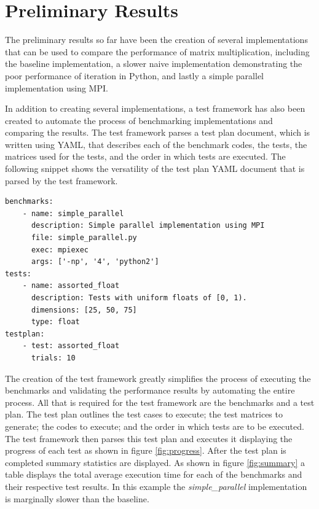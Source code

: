 \documentclass[oneside]{article}
\begin{document}
\section{Preliminary Results}

The preliminary results so far have been the creation of several implementations that can be used to compare the performance of matrix multiplication, including the baseline implementation, a slower naive implementation demonstrating the poor performance of iteration in Python, and lastly a simple parallel implementation using MPI.

In addition to creating several implementations, a test framework has also been created to automate the process of benchmarking implementations and comparing the results. The test framework parses a test plan document, which is written using YAML, that describes each of the benchmark codes, the tests, the matrices used for the tests, and the order in which tests are executed. The following snippet shows the versatility of the test plan YAML document that is parsed by the test framework.


\singlespacing
\begin{verbatim}
benchmarks:
    - name: simple_parallel
      description: Simple parallel implementation using MPI
      file: simple_parallel.py
      exec: mpiexec
      args: ['-np', '4', 'python2']
tests:
    - name: assorted_float
      description: Tests with uniform floats of [0, 1).
      dimensions: [25, 50, 75]
      type: float
testplan:
    - test: assorted_float
      trials: 10
\end{verbatim}


\doublespacing
The creation of the test framework greatly simplifies the process of executing the benchmarks and validating the performance results by automating the entire process. All that is required for the test framework are the benchmarks and a test plan. The test plan outlines the test cases to execute; the test matrices to generate; the codes to execute; and the order in which tests are to be executed. The test framework then parses this test plan and executes it displaying the progress of each test as shown in figure \ref{fig:progress}. After the test plan is completed summary statistics are displayed. As shown in figure \ref{fig:summary} a table displays the total average execution time for each of the benchmarks and their respective test results. In this example the \emph{simple\_parallel} implementation is marginally slower than the baseline.
\end{document}
